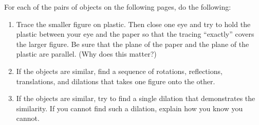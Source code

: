 \begin{prob}
For each of the pairs of objects on the following pages, do the following:  
\begin{enumerate}
\item Trace the smaller figure on plastic.  Then close one eye and try to hold the plastic between your eye and the paper so that the tracing ``exactly'' covers the larger figure.   Be sure that the plane of the paper and the plane of the plastic are parallel.  (Why does this matter?) 
\item If the objects are similar, find a sequence of rotations, reflections, translations, and dilations that takes one figure onto the other.  
\item If the objects are similar, try to find a single dilation that demonstrates the similarity.   If you cannot find such a dilation, explain how you know you cannot.  
\end{enumerate}
\end{prob}

